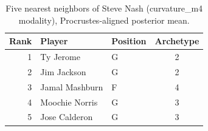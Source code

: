 \begin{table}[htbp]
  \centering\small
  \begin{tabular}{rllc}
    \toprule
    Rank & Player & Position & Archetype \\
    \midrule
    1 & Ty Jerome & G & 2 \\
    2 & Jim Jackson & G & 2 \\
    3 & Jamal Mashburn & F & 4 \\
    4 & Moochie Norris & G & 3 \\
    5 & Jose Calderon & G & 3 \\
    \bottomrule
  \end{tabular}
  \caption{Five nearest neighbors of Steve Nash (curvature_m4 modality), Procrustes-aligned posterior mean.}
  \label{tab:Steve_Nash_neighbors_curvature_m4}
\end{table}

